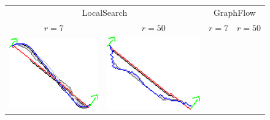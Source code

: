 \begin{figure}
\center
\begin{tabular}{cccc}
\multicolumn{2}{c}{LocalSearch} & \multicolumn{2}{c}{GraphFlow}\\
$r=7$ & $r=50$ & $r=7$ & $r=50$\\

\includegraphics[scale=0.2]{figures/chapter9/constrained-elastica/localsearch/curve-2/len_pen-0.0002/radius-7/nc-4/h1.0/summary.pdf} &
\includegraphics[scale=0.2]{figures/chapter9/constrained-elastica/localsearch/curve-2/len_pen-0.0002/radius-50/nc-4/h1.0/summary.pdf} &

\end{tabular}
\end{figure}
